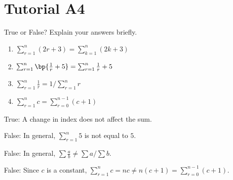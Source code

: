\section{Tutorial A4}

\begin{problem}
    True or False? Explain your answers briefly.

    \begin{enumerate}
        \item $\sum_{r=1}^n (2r + 3) = \sum_{k=1}^n (2k + 3)$
        \item $\sum_{r = 1}^n \bp{\frac1r + 5} = \sum_{r=1}^n \frac1r + 5$
        \item $\sum_{r=1}^n \frac1r = 1 / {\sum_{r=1}^n r}$
        \item $\sum_{r=1}^n c = \sum_{r=0}^{n-1} (c+1)$
    \end{enumerate}
\end{problem}
\begin{solution}
    \begin{ppart}
        True: A change in index does not affect the sum.
    \end{ppart}
    \begin{ppart}
        False: In general, $\sum_{r = 1}^n 5$ is not equal to $5$.
    \end{ppart}
    \begin{ppart}
        False: In general, $\sum \frac{a}{b} \neq {\sum a} / {\sum b}$.
    \end{ppart}
    \begin{ppart}
        False: Since $c$ is a constant, $\sum_{r=1}^n c = nc \neq n(c+1) = \sum_{r=0}^{n-1} (c+1)$.
    \end{ppart}
\end{solution}

